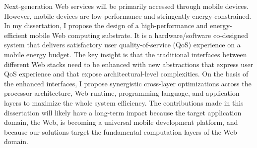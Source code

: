 
%
\utabstract
\indent
Next-generation Web services will be primarily accessed through mobile devices. However, mobile devices are low-performance and stringently energy-constrained. In my dissertation, I propose the design of a high-performance and energy-efficient mobile Web computing substrate. It is a hardware/software co-designed system that delivers satisfactory user quality-of-service (QoS) experience on a mobile energy budget. The key insight is that the traditional interfaces between different Web stacks need to be enhanced with new abstractions that express user QoS experience and that expose architectural-level complexities. On the basis of the enhanced interfaces, I propose synergistic cross-layer optimizations across the processor architecture, Web runtime, programming language, and application layers to maximize the whole system efficiency. The contributions made in this dissertation will likely have a long-term impact because the target application domain, the Web, is becoming a universal mobile development platform, and because our solutions target the fundamental computation layers of the Web domain.

